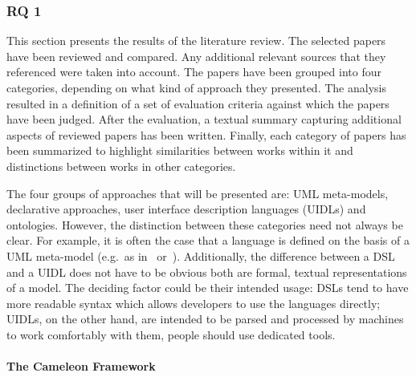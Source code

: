 \subsubsection{RQ 1}\label{subsubsec:rq-1}

This section presents the results of the literature review.
The selected papers have been reviewed and compared.
Any additional relevant sources that they referenced were taken into account.
The papers have been grouped into four categories, depending on what kind of approach they presented.
The analysis resulted in a definition of a set of evaluation criteria against which the papers have been judged.
After the evaluation, a textual summary capturing additional aspects of reviewed papers has been written.
Finally, each category of papers has been summarized to highlight similarities between works within it and distinctions between works in other categories.

The four groups of approaches that will be presented are: UML meta-models, declarative approaches, user interface description languages (UIDLs) and ontologies.
However, the distinction between these categories need not always be clear.
For example, it is often the case that a language is defined on the basis of a UML meta-model (e.g.\ as in~\cite{Karu2013-po} or~\cite{moldovan2020open}).
Additionally, the difference between a DSL and a UIDL does not have to be obvious\,\textemdash\,both are formal, textual representations of a model.
The deciding factor could be their intended usage: DSLs tend to have more readable syntax which allows developers to use the languages directly;
UIDLs, on the other hand, are intended to be parsed and processed by machines\,\textemdash\,to work comfortably with them, people should use dedicated tools.

\paragraph{The Cameleon Framework}

